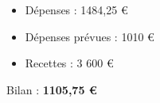 \begin{frame}
   \begin{itemize}
      \item Dépenses : 1484,25 €
      \item Dépenses prévues : 1010 €
      \item Recettes : 3 600 €
   \end{itemize}
   Bilan : \textbf{1105,75 €}
\end{frame}
